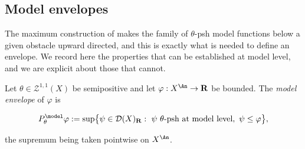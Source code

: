 \subsection{Model envelopes}
\label{sec:ch20-envelopes}

The maximum construction of  makes the family of
\(\theta\)-psh model functions below a given obstacle upward directed, and
this is exactly what is needed to define an envelope.  We record here the
properties that can be established at model level, and we are explicit about
those that cannot.

\begin{definition}
\label{def:ch20-model-envelope}
Let \(\theta\in\mathcal Z^{1,1}(X)\) be semipositive and let
\(\varphi:X^{\An}\to\mathbf R\) be bounded.  The \emph{model envelope} of
\(\varphi\) is

\begin{equation}
\label{eq:ch20-model-envelope}
 P^{\model}_\theta\varphi
 :=\sup\bigl\{\psi\in\mathcal D(X)_{\mathbf R}:\
   \psi\ \theta\text{-psh at model level},\ \psi\leq\varphi\bigr\},
\end{equation}

the supremum being taken pointwise on \(X^{\An}\).
\end{definition}

